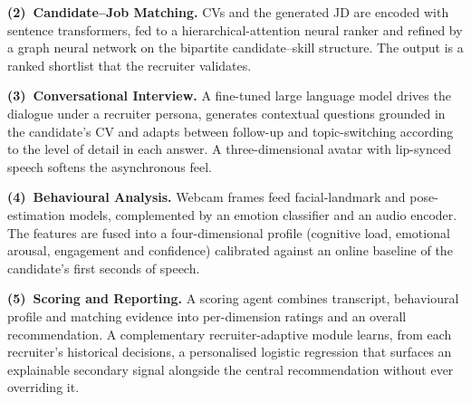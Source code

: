 \textbf{(2)~Candidate--Job Matching.} CVs and the generated JD are encoded
with sentence transformers, fed to a hierarchical-attention neural ranker
and refined by a graph neural network on the bipartite candidate--skill
structure. The output is a ranked shortlist that the recruiter validates.

\textbf{(3)~Conversational Interview.} A fine-tuned large language model
drives the dialogue under a recruiter persona, generates contextual
questions grounded in the candidate's CV and adapts between follow-up and
topic-switching according to the level of detail in each answer. A
three-dimensional avatar with lip-synced speech softens the asynchronous
feel.

\textbf{(4)~Behavioural Analysis.} Webcam frames feed facial-landmark and
pose-estimation models, complemented by an emotion classifier and an audio
encoder. The features are fused into a four-dimensional profile (cognitive
load, emotional arousal, engagement and confidence) calibrated against an
online baseline of the candidate's first seconds of speech.

\textbf{(5)~Scoring and Reporting.} A scoring agent combines transcript,
behavioural profile and matching evidence into per-dimension ratings and
an overall recommendation. A complementary recruiter-adaptive module learns,
from each recruiter's historical decisions, a personalised logistic
regression that surfaces an explainable secondary signal alongside the
central recommendation without ever overriding it.

